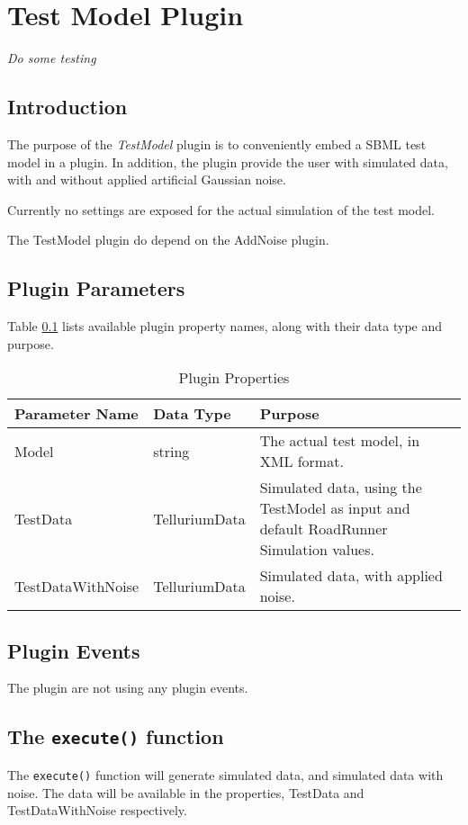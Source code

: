 \chapter*{Test Model Plugin}
\setcounter{chapter}{1}
\emph{Do some testing}
\section{Introduction}
The purpose of the \emph{TestModel} plugin is to conveniently embed a SBML test model in a plugin. In addition, the plugin provide the user with simulated data, with and without applied artificial Gaussian noise. 

Currently no settings are exposed for the actual simulation of the test model.

The TestModel plugin do depend on the AddNoise plugin.
 
\section{Plugin Parameters}
Table \ref{table:PluginProperties} lists available plugin property names, along with their data type and purpose.


\begin{table}[ht]
\centering %
\begin{tabular}{l l p{7.5cm}} %

Parameter Name & Data Type & Purpose \\ [0.5ex] %
\hline %
Model         			& 	string 				& The actual test model, in XML format. \\
TestData      			& 	TelluriumData    	& Simulated data, using the TestModel as input and default RoadRunner Simulation values. \\
TestDataWithNoise    	& 	TelluriumData  	    & Simulated data, with applied noise. \\

\hline %
\end{tabular}
\caption{Plugin Properties} 
\label{table:PluginProperties} 
\end{table}

\section{Plugin Events}
The plugin are not using any plugin events.


\section{The \texttt{execute()} function}
The \verb|execute()| function will generate simulated data, and simulated data with noise. The data will be available in the properties, TestData and TestDataWithNoise respectively. 

